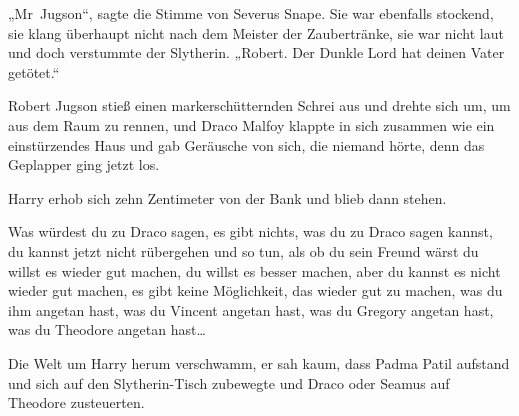 „Mr~Jugson“, sagte die Stimme von Severus Snape.
Sie war ebenfalls stockend, sie klang überhaupt nicht nach dem Meister der Zaubertränke, sie war nicht laut und doch verstummte der Slytherin.
„Robert. Der Dunkle Lord hat deinen Vater getötet.“

Robert Jugson stieß einen markerschütternden Schrei aus und drehte sich um, um aus dem Raum zu rennen, und Draco Malfoy klappte in sich zusammen wie ein einstürzendes Haus und gab Geräusche von sich, die niemand hörte, denn das Geplapper ging jetzt los.

Harry erhob sich zehn Zentimeter von der Bank und blieb dann stehen.

Was würdest du zu Draco sagen, es gibt nichts, was du zu Draco sagen kannst, du kannst jetzt nicht rübergehen und so tun, als ob du sein Freund wärst
du willst es wieder gut machen, du willst es besser machen, aber du kannst es nicht wieder gut machen, es gibt keine Möglichkeit, das wieder gut zu machen, was du ihm angetan hast, was du Vincent angetan hast, was du Gregory angetan hast, was du Theodore angetan hast…

Die Welt um Harry herum verschwamm, er sah kaum, dass Padma Patil aufstand und sich auf den Slytherin-Tisch zubewegte und Draco oder Seamus auf Theodore zusteuerten.

